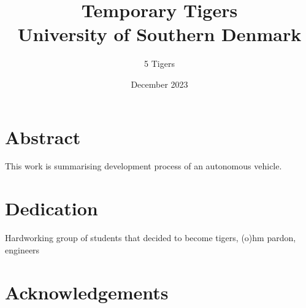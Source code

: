 \documentclass{report}
\title{Temporary Tigers\\
{\Large University of Southern Denmark}}
\author{ 5 Tigers }
\date{December 2023}
\begin{document}
\maketitle

\chapter*{Abstract}
This work is summarising development process of an autonomous vehicle.

\chapter*{Dedication}
Hardworking group of students that decided to become tigers, (o)hm pardon, engineers

\chapter *{Acknowledgements}





\end{document}
